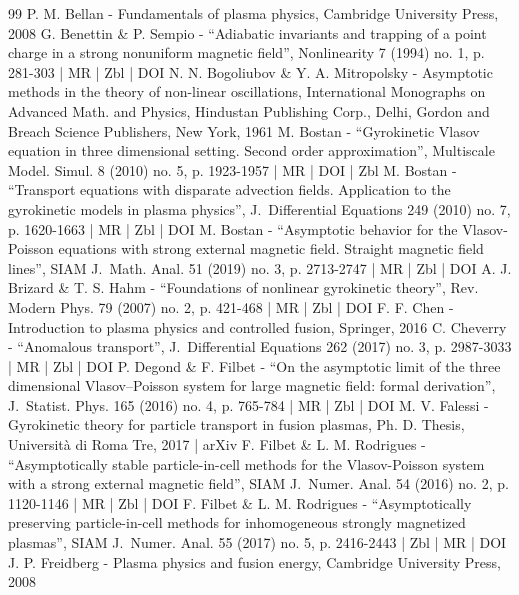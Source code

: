 \begin{thebibliography}{99}
P. M. Bellan - Fundamentals of plasma physics, Cambridge University Press, 2008
G. Benettin \& P. Sempio - “Adiabatic invariants and trapping of a point charge in a strong nonuniform magnetic field”, Nonlinearity 7 (1994) no. 1, p. 281-303 | MR | Zbl | DOI
N. N. Bogoliubov \& Y. A. Mitropolsky - Asymptotic methods in the theory of non-linear oscillations, International Monographs on Advanced Math. and Physics, Hindustan Publishing Corp., Delhi, Gordon and Breach Science Publishers, New York, 1961
M. Bostan - “Gyrokinetic Vlasov equation in three dimensional setting. Second order approximation”, Multiscale Model. Simul. 8 (2010) no. 5, p. 1923-1957 | MR | DOI | Zbl
M. Bostan - “Transport equations with disparate advection fields. Application to the gyrokinetic models in plasma physics”, J. Differential Equations 249 (2010) no. 7, p. 1620-1663 | MR | Zbl | DOI
M. Bostan - “Asymptotic behavior for the Vlasov-Poisson equations with strong external magnetic field. Straight magnetic field lines”, SIAM J. Math. Anal. 51 (2019) no. 3, p. 2713-2747 | MR | Zbl | DOI
A. J. Brizard \& T. S. Hahm - “Foundations of nonlinear gyrokinetic theory”, Rev. Modern Phys. 79 (2007) no. 2, p. 421-468 | MR | Zbl | DOI
F. F. Chen - Introduction to plasma physics and controlled fusion, Springer, 2016
C. Cheverry - “Anomalous transport”, J. Differential Equations 262 (2017) no. 3, p. 2987-3033 | MR | Zbl | DOI
P. Degond \& F. Filbet - “On the asymptotic limit of the three dimensional Vlasov–Poisson system for large magnetic field: formal derivation”, J. Statist. Phys. 165 (2016) no. 4, p. 765-784 | MR | Zbl | DOI
M. V. Falessi - Gyrokinetic theory for particle transport in fusion plasmas, Ph. D. Thesis, Università di Roma Tre, 2017 | arXiv
F. Filbet \& L. M. Rodrigues - “Asymptotically stable particle-in-cell methods for the Vlasov-Poisson system with a strong external magnetic field”, SIAM J. Numer. Anal. 54 (2016) no. 2, p. 1120-1146 | MR | Zbl | DOI
F. Filbet \& L. M. Rodrigues - “Asymptotically preserving particle-in-cell methods for inhomogeneous strongly magnetized plasmas”, SIAM J. Numer. Anal. 55 (2017) no. 5, p. 2416-2443 | Zbl | MR | DOI
J. P. Freidberg - Plasma physics and fusion energy, Cambridge University Press, 2008

\end{thebibliography}
